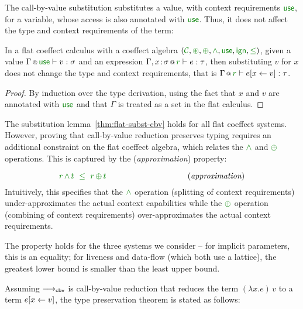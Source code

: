 \noindent
The call-by-value substitution substitutes a value, with context requirements $\cunit$, for a 
variable, whose access is also annotated with $\cunit$. Thus, it does not affect the type and
context requirements of the term:

\begin{lemma}
\label{thm:flat-subst-cbv}
In a flat coeffect calculus with a coeffect algebra $(\C, \cseq, \cpar, \czip, \cunit, \czero, \cleq)$,
given a value $\coctx{\Gamma}{\cunit} \vdash v : \sigma$ and an expression
$\coctx{\Gamma,  x\!:\!\sigma}{ \cclrd{r}  } \vdash e : \tau$, then substituting $v$ for $x$ does not
change the type and context requirements, that is $\coctx{\Gamma}{ \cclrd{r} } \vdash \subst{e}{x}{v} : \tau$.
\end{lemma}
\begin{proof}
By induction over the type derivation, using the fact that $x$ and $v$ are annotated
with $\cunit$ and that $\Gamma$ is treated as a set in the flat calculus.
\end{proof}

\noindent
The substitution lemma~\ref{thm:flat-subst-cbv} holds for all flat coeffect systems. However, 
proving that call-by-value reduction preserves typing requires an additional constraint on the
flat coeffect algebra, which relates the $\czip$ and $\cpar$ operations. This is captured
by the (\emph{approximation}) property:

\begin{equation*}
\cclrd{r}\,\czip\,\cclrd{t}~\;\cleq~\;\cclrd{r}\,\cpar\,\cclrd{t}
\hspace{10em}(\textit{approximation})
\end{equation*}
%
Intuitively, this specifies that the $\czip$ operation (splitting of context requirements) 
under-approximates the actual context capabilities while the $\cpar$ operation (combining of
context requirements) over-approximates the actual context requirements.

The property holds for the three systems we consider -- for implicit parameters, this is 
an equality; for liveness and data-flow (which both use a lattice), the greatest lower bound 
is smaller than the least upper bound.

Assuming $\longrightarrow_{\textnormal{\sffamily cbv}}$ is call-by-value reduction that reduces the term 
$(\lambda x.e)\,v$ to a term $e[x \leftarrow v]$, the type preservation theorem is
stated as follows:

